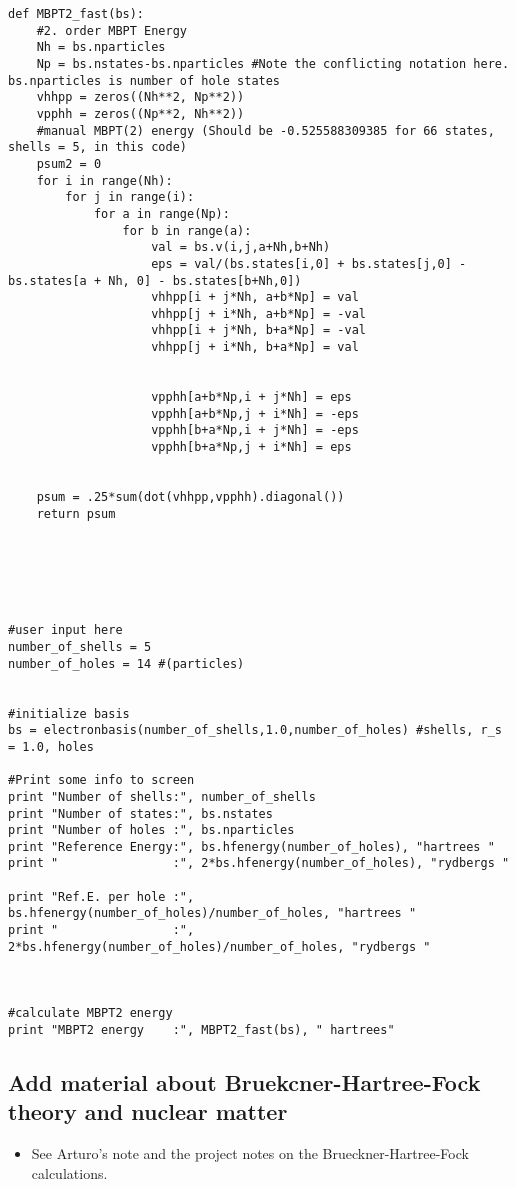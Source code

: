 \documentclass[%
oneside,                 %
final,                   %
10pt]{article}
\newenvironment{doconceexercise}{}{}
\begin{document}
\begin{doconceexercise}
\begin{verbatim}
def MBPT2_fast(bs):
    #2. order MBPT Energy 
    Nh = bs.nparticles
    Np = bs.nstates-bs.nparticles #Note the conflicting notation here. bs.nparticles is number of hole states 
    vhhpp = zeros((Nh**2, Np**2))
    vpphh = zeros((Np**2, Nh**2))
    #manual MBPT(2) energy (Should be -0.525588309385 for 66 states, shells = 5, in this code)
    psum2 = 0
    for i in range(Nh):
        for j in range(i):
            for a in range(Np):
                for b in range(a):
                    val = bs.v(i,j,a+Nh,b+Nh)
                    eps = val/(bs.states[i,0] + bs.states[j,0] - bs.states[a + Nh, 0] - bs.states[b+Nh,0])
                    vhhpp[i + j*Nh, a+b*Np] = val 
                    vhhpp[j + i*Nh, a+b*Np] = -val 
                    vhhpp[i + j*Nh, b+a*Np] = -val
                    vhhpp[j + i*Nh, b+a*Np] = val 
        
                    
                    vpphh[a+b*Np,i + j*Nh] = eps
                    vpphh[a+b*Np,j + i*Nh] = -eps
                    vpphh[b+a*Np,i + j*Nh] = -eps
                    vpphh[b+a*Np,j + i*Nh] = eps
                    
                    
    psum = .25*sum(dot(vhhpp,vpphh).diagonal())
    return psum






#user input here
number_of_shells = 5
number_of_holes = 14 #(particles)


#initialize basis    
bs = electronbasis(number_of_shells,1.0,number_of_holes) #shells, r_s = 1.0, holes

#Print some info to screen
print "Number of shells:", number_of_shells
print "Number of states:", bs.nstates
print "Number of holes :", bs.nparticles
print "Reference Energy:", bs.hfenergy(number_of_holes), "hartrees "
print "                :", 2*bs.hfenergy(number_of_holes), "rydbergs "

print "Ref.E. per hole :", bs.hfenergy(number_of_holes)/number_of_holes, "hartrees "
print "                :", 2*bs.hfenergy(number_of_holes)/number_of_holes, "rydbergs "



#calculate MBPT2 energy
print "MBPT2 energy    :", MBPT2_fast(bs), " hartrees"
\end{verbatim}


\end{doconceexercise}


\subsection*{Add material about Bruekcner-Hartree-Fock theory and nuclear matter}
\begin{itemize}
\item See Arturo's note and the project notes on the Brueckner-Hartree-Fock calculations.
\end{itemize}

\noindent



\printindex
\end{document}
